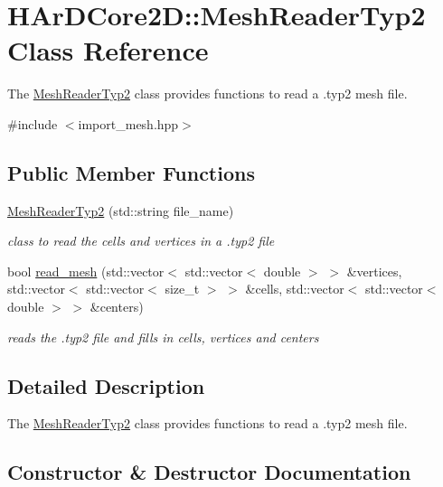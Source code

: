 \hypertarget{classHArDCore2D_1_1MeshReaderTyp2}{}\section{H\+Ar\+D\+Core2D\+:\+:Mesh\+Reader\+Typ2 Class Reference}
\label{classHArDCore2D_1_1MeshReaderTyp2}


The \hyperlink{classHArDCore2D_1_1MeshReaderTyp2}{Mesh\+Reader\+Typ2} class provides functions to read a .typ2 mesh file.  




{\ttfamily \#include $<$import\+\_\+mesh.\+hpp$>$}

\subsection*{Public Member Functions}
\begin{DoxyCompactItemize}
\item 
\hyperlink{classHArDCore2D_1_1MeshReaderTyp2_a0b4f74d0e71a0efba9699e6960d43205}{Mesh\+Reader\+Typ2} (std\+::string file\+\_\+name)
\begin{DoxyCompactList}\small\item\em class to read the cells and vertices in a .typ2 file \end{DoxyCompactList}\item 
bool \hyperlink{classHArDCore2D_1_1MeshReaderTyp2_a495a9de74127ecdf3c30c041863b9dd0}{read\+\_\+mesh} (std\+::vector$<$ std\+::vector$<$ double $>$ $>$ \&vertices, std\+::vector$<$ std\+::vector$<$ size\+\_\+t $>$ $>$ \&cells, std\+::vector$<$ std\+::vector$<$ double $>$ $>$ \&centers)
\begin{DoxyCompactList}\small\item\em reads the .typ2 file and fills in cells, vertices and centers \end{DoxyCompactList}\end{DoxyCompactItemize}


\subsection{Detailed Description}
The \hyperlink{classHArDCore2D_1_1MeshReaderTyp2}{Mesh\+Reader\+Typ2} class provides functions to read a .typ2 mesh file. 

\subsection{Constructor \& Destructor Documentation}
\mbox{\label{classHArDCore2D_1_1MeshReaderTyp2_a0b4f74d0e71a0efba9699e6960d43205}} 
